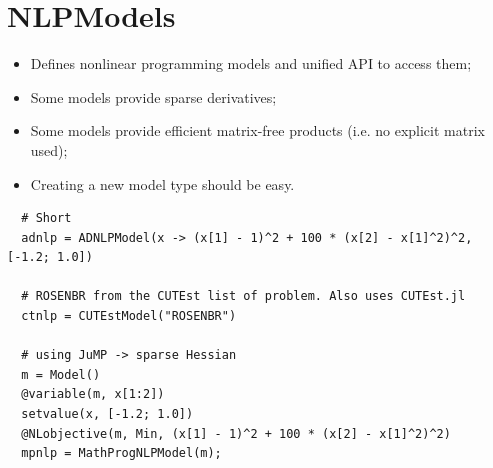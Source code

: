 
\section{NLPModels}

\begin{frame}[fragile,t]

  \begin{itemize}
    \item Defines nonlinear programming models and unified API to access them;
    \item Some models provide sparse derivatives;
    \item Some models provide efficient matrix-free products (i.e. no explicit matrix
      used);
    \item Creating a new model type should be easy.
  \end{itemize}
\end{frame}

\begin{frame}[fragile,t]
\begin{lstlisting}
  # Short
  adnlp = ADNLPModel(x -> (x[1] - 1)^2 + 100 * (x[2] - x[1]^2)^2, [-1.2; 1.0])

  # ROSENBR from the CUTEst list of problem. Also uses CUTEst.jl
  ctnlp = CUTEstModel("ROSENBR")

  # using JuMP -> sparse Hessian
  m = Model()
  @variable(m, x[1:2])
  setvalue(x, [-1.2; 1.0])
  @NLobjective(m, Min, (x[1] - 1)^2 + 100 * (x[2] - x[1]^2)^2)
  mpnlp = MathProgNLPModel(m);
\end{lstlisting}
\end{frame}

